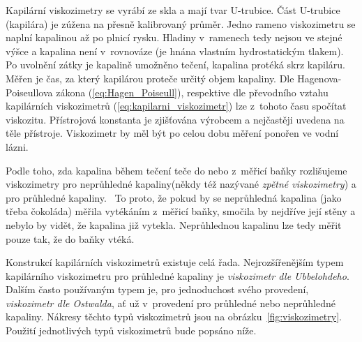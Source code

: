 \documentclass[12pt]{article}
\begin{document}
Kapilární viskozimetry se vyrábí ze skla a mají tvar U-trubice. Část U-trubice (kapilára) je zúžena na přesně kalibrovaný průměr. Jedno rameno viskozimetru se naplní kapalinou až po plnicí rysku. Hladiny v~ramenech tedy nejsou ve stejné výšce a kapalina není v~rovnováze (je hnána vlastním hydrostatickým tlakem). Po uvolnění zátky je kapalině umožněno tečení, kapalina protéká skrz kapiláru. Měřen je čas, za který kapilárou proteče určitý objem kapaliny. Dle Hagenova-Poiseullova zákona (\ref{eq:Hagen_Poiseull}), respektive dle převodního vztahu kapilárních viskozimetrů (\ref{eq:kapilarni_viskozimetr}) lze z~tohoto času spočítat viskozitu. Přístrojová konstanta je zjišťována výrobcem a nejčastěji uvedena na těle přístroje. Viskozimetr by měl být po celou dobu měření ponořen ve vodní lázni.
\par
Podle toho, zda kapalina během tečení teče do nebo z~měřicí baňky rozlišujeme viskozimetry \glqq pro neprůhledné kapaliny\grqq\space(někdy též nazývané \emph{zpětné viskozimetry}) a \glqq pro průhledné kapaliny\grqq.~\cite{book:Calibration_of_viscometers} To proto, že pokud by se neprůhledná kapalina (jako třeba čokoláda) měřila vytékáním z~měřicí baňky, smočila by nejdříve její stěny a nebylo by vidět, že kapalina již vytekla. Neprůhlednou kapalinu lze tedy měřit pouze tak, že do baňky vtéká.
\par
Konstrukcí kapilárních viskozimetrů existuje celá řada. Nejrozšířenějším typem kapilárního viskozimetru pro průhledné kapaliny je \emph{viskozimetr dle Ubbelohdeho}. Dalším často používaným typem je, pro jednoduchost svého provedení, \emph{viskozimetr dle Ostwalda}, ať už v~provedení pro průhledné nebo neprůhledné kapaliny. Nákresy těchto typů viskozimetrů jsou na obrázku~\ref{fig:viskozimetry}. Použití jednotlivých typů viskozimetrů bude popsáno níže.
\end{document}
